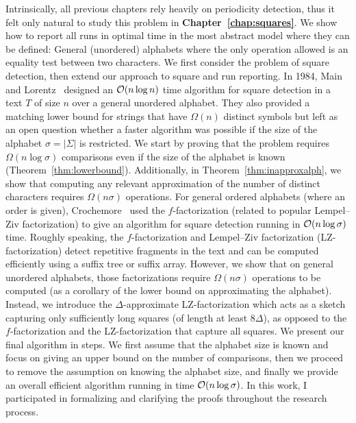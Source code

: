 Intrinsically, all previous chapters rely heavily on periodicity detection, thus it felt only natural to study this problem in \textbf{Chapter~\ref{chap:squares}}. We show how to report all runs  in optimal time in the most abstract model where they can be defined: General (unordered) alphabets where the only operation allowed is an equality test between two characters. 
We first consider the problem of square detection, then extend our approach to square and run reporting.
In 1984, Main and Lorentz~\cite{Main1984} designed an $\mathcal{O}(n\log n)$ time algorithm for square detection in a text $T$ of size $n$ over a general unordered alphabet. They also provided a matching lower bound for strings that have $\Omega(n)$ distinct symbols but left as an open question whether a faster algorithm was possible if the size of the alphabet $\sigma=|\Sigma|$ is restricted.
We start by proving that the problem requires $\Omega(n \log \sigma)$ comparisons even if the size of the alphabet is known (Theorem~\ref{thm:lowerbound}). Additionally, in Theorem~\ref{thm:inapproxalph}, we show that computing any relevant approximation of the number of distinct characters requires $\Omega(n\sigma)$ operations.
For general ordered alphabets (where an order is given), Crochemore~\cite{Crochemore1986} used the $f$-factorization (related to popular Lempel--Ziv factorization) to give an algorithm for square detection running in $\mathcal{O}(n\log \sigma)$ time. Roughly speaking, the $f$-factorization and Lempel--Ziv factorization (LZ-factorization) detect repetitive fragments in the text and can be computed efficiently using a suffix tree or suffix array. However,  we show that on general unordered alphabets, those factorizations require $\Omega(n\sigma)$ operations to be computed (as a corollary of the lower bound on approximating the alphabet). %
Instead, we introduce the $\Delta$-approximate LZ-factorization which acts as a sketch capturing only sufficiently long squares (of length at least $8\Delta$), as opposed to the $f$-factorization and the LZ-factorization that capture all squares.
We present our final algorithm in steps. We first assume that the alphabet size is known and focus on giving an upper bound on the number of comparisons, then we proceed to remove the assumption on knowing the alphabet size, and finally we provide an overall efficient algorithm running in time $\mathcal{O}(n\log\sigma)$.
In this work, I participated in formalizing and clarifying the proofs throughout the research process. %

